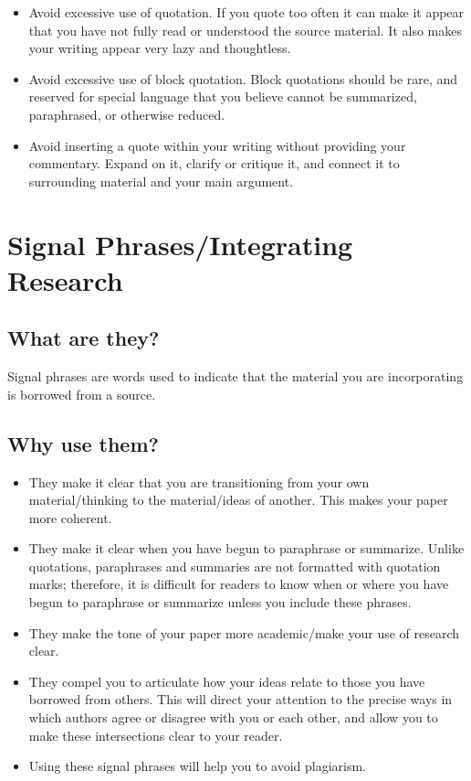 \begin{itemize}
\item Avoid excessive use of quotation. If you quote too often it can make it appear 
that you have not fully read or understood the source material. It also makes your
writing appear very lazy and thoughtless.

\item Avoid excessive use of block quotation. Block quotations should be rare, and reserved
for special language that you believe cannot be summarized, paraphrased, or otherwise reduced.

\item Avoid inserting a quote within your writing without providing your commentary. 
Expand on it, clarify or critique it, and connect it to surrounding material and your main argument.

\end{itemize}


\section{Signal Phrases/Integrating Research}
 
 
\subsection{What are they?}
 
Signal phrases are words used to indicate that the material you are incorporating is 
borrowed from a source.
 
\subsection {Why use them?}
 \begin{itemize}

\item They make it clear that you are transitioning from your own material/thinking to the 
material/ideas of another. This makes your paper more coherent.
 
\item They make it clear when you have begun to paraphrase or summarize. Unlike quotations, 
paraphrases and summaries are not formatted with quotation marks; therefore, it is 
difficult for readers to know when or where you have begun to paraphrase or summarize 
unless you include these phrases.
 
\item They make the tone of your paper more academic/make your use of research clear.
 
\item They compel you to articulate how your ideas relate to those you have borrowed from
others. This will direct your attention to the precise ways in which authors agree or 
disagree with you or each other, and allow you to make these intersections clear to 
your reader.
 
\item Using these signal phrases will help you to avoid plagiarism.
 \end{itemize}
 
